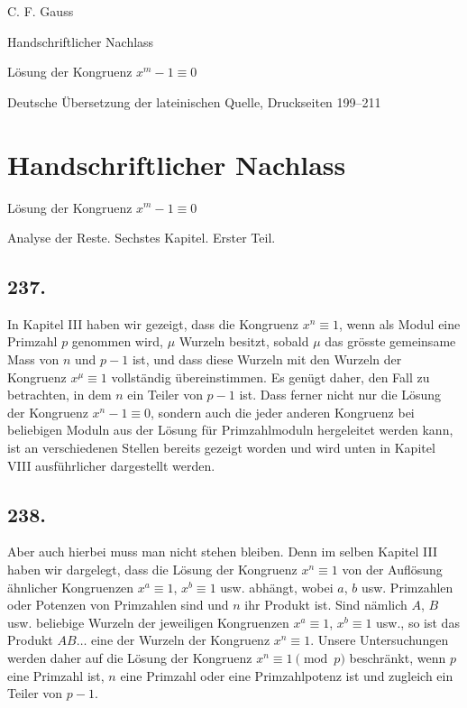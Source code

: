 \documentclass[12pt]{article}
\begin{document}
\begin{center}
{\Large C. F. Gauss}\par
{\large Handschriftlicher Nachlass}\par
{\large Lösung der Kongruenz $x^m-1\equiv0$}\par
{\large Deutsche Übersetzung der lateinischen Quelle, Druckseiten 199--211}
\end{center}

\section*{Handschriftlicher Nachlass}

\begin{center}
{\large Lösung der Kongruenz $x^m-1 \equiv 0$}\par
{\large Analyse der Reste. Sechstes Kapitel. Erster Teil.}
\end{center}

\subsection*{237.}
In Kapitel III haben wir gezeigt, dass die Kongruenz $x^n\equiv 1$, wenn als Modul eine Primzahl $p$ genommen wird, $\mu$ Wurzeln besitzt, sobald $\mu$ das grösste gemeinsame Mass von $n$ und $p-1$ ist, und dass diese Wurzeln mit den Wurzeln der Kongruenz $x^\mu\equiv 1$ vollständig übereinstimmen. Es genügt daher, den Fall zu betrachten, in dem $n$ ein Teiler von $p-1$ ist. Dass ferner nicht nur die Lösung der Kongruenz $x^n-1\equiv 0$, sondern auch die jeder anderen Kongruenz bei beliebigen Moduln aus der Lösung für Primzahlmoduln hergeleitet werden kann, ist an verschiedenen Stellen bereits gezeigt worden und wird unten in Kapitel VIII ausführlicher dargestellt werden.

\subsection*{238.}
Aber auch hierbei muss man nicht stehen bleiben. Denn im selben Kapitel III haben wir dargelegt, dass die Lösung der Kongruenz $x^n\equiv 1$ von der Auflösung ähnlicher Kongruenzen $x^a\equiv 1$, $x^b\equiv 1$ usw. abhängt, wobei $a$, $b$ usw. Primzahlen oder Potenzen von Primzahlen sind und $n$ ihr Produkt ist. Sind nämlich $A$, $B$ usw. beliebige Wurzeln der jeweiligen Kongruenzen $x^a\equiv 1$, $x^b\equiv 1$ usw., so ist das Produkt $AB\ldots$ eine der Wurzeln der Kongruenz $x^n\equiv 1$. Unsere Untersuchungen werden daher auf die Lösung der Kongruenz $x^n\equiv 1\pmod p$ beschränkt, wenn $p$ eine Primzahl ist, $n$ eine Primzahl oder eine Primzahlpotenz ist und zugleich ein Teiler von $p-1$.
\end{document}
